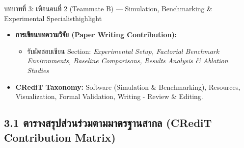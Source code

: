 \documentclass[10pt,a4paper]{article}
\begin{document}
\begin{rolebox}{บทบาทที่ 3: เพื่อนคนที่ 2 (Teammate B) — Simulation, Benchmarking \& Experimental Specialist}{highlight}
\begin{itemize}[leftmargin=12pt, itemsep=1pt, topsep=1pt, parsep=0pt]
\begin{itemize}[itemsep=0.5pt, parsep=0pt]
        \item ทดสอบรัน ROS 2 Humble Node / PX4 Hardware Bridge วัดเวลาในการคำนวณจริง (Latency Benchmarks $<0.2\,$ms)
      \end{itemize}
    \item \textbf{การเขียนบทความวิจัย (Paper Writing Contribution):}
      \begin{itemize}[itemsep=0.5pt, parsep=0pt]
        \item รับผิดชอบเขียน Section: \textit{Experimental Setup, Factorial Benchmark Environments, Baseline Comparisons, Results Analysis \& Ablation Studies}
      \end{itemize}
    \item \textbf{CRediT Taxonomy:} Software (Simulation \& Benchmarking), Resources, Visualization, Formal Validation, Writing - Review \& Editing.
  \end{itemize}
\end{rolebox}

\vspace{6pt}
\subsection*{\normalsize 3.1 ตารางสรุปส่วนร่วมตามมาตรฐานสากล (CRediT Contribution Matrix)}
\vspace{-3pt}
\end{document}
